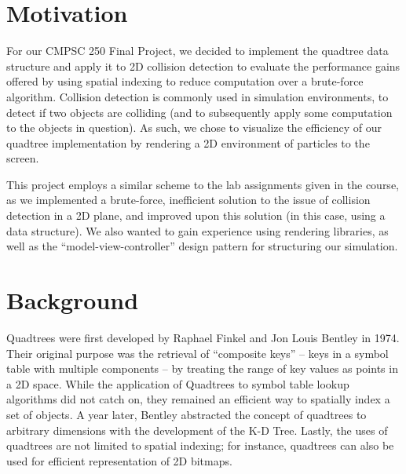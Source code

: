 
\usepackage{amsmath}
\usepackage{setspace}
\usepackage{amssymb}
\usepackage{amsthm}
\usepackage{listings}
\usepackage{tikz}
\usepackage{csvsimple}
\usepackage{minted}
\usepackage{fancyvrb}
\usepackage{multicol}
\setlength{\parindent}{0pt}

\lstset{breaklines=true, showstringspaces=false,
    basicstyle=\footnotesize\ttfamily
}


\doublespacing

\MYHEADERS
{}

    \section{Motivation}
      For our CMPSC 250 Final Project, we decided to implement the
      quadtree data structure and apply it to 2D collision detection to
      evaluate the performance gains offered by using spatial indexing
      to reduce computation over a brute-force algorithm. Collision
      detection is commonly used in simulation environments, to detect
      if two objects are colliding (and to subsequently apply some
      computation to the objects in question). As such, we chose to
      visualize the efficiency of our quadtree implementation by
      rendering a 2D environment of particles to the screen.  \par This
      project employs a similar scheme to the lab assignments given in
      the course, as we implemented a brute-force, inefficient solution
      to the issue of collision detection in a 2D plane, and improved
      upon this solution (in this case, using a data structure). We also
      wanted to gain experience using rendering libraries, as well as
      the “model-view-controller” design pattern for structuring our
      simulation.

    \section{Background}
      Quadtrees were first developed by Raphael Finkel and Jon Louis
      Bentley in 1974. Their original purpose was the retrieval of
      “composite keys” -- keys in a symbol table with multiple
      components -- by treating the range of key values as points in a
      2D space. While the application of Quadtrees to symbol table
      lookup algorithms did not catch on, they remained an efficient way
      to spatially index a set of objects. A year later, Bentley
      abstracted the concept of quadtrees to arbitrary dimensions with
      the development of the K-D Tree. Lastly, the uses of quadtrees are
      not limited to spatial indexing; for instance, quadtrees can also
      be used for efficient representation of 2D bitmaps.

